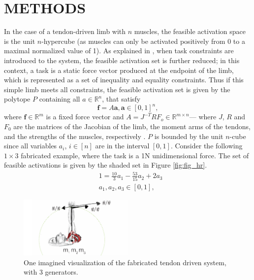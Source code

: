 \section{METHODS}
\label{s:methods}
In the case of a tendon-driven limb with $n$ muscles, the feasible activation space is the unit $n$-hypercube (as muscles can only be activated positively from 0 to a maximal normalized value of 1). As explained in \cite{Valero-Cuevas2009mathematical}, when task constraints are introduced to the system, the feasible activation set is further reduced; in this context, a task is a static force vector produced at the endpoint of the limb, which is represented as a set of inequality and equality constraints. Thus if this simple limb meets all constraints, the feasible activation set is given by the polytope $P$ containing all $a \in \mathbb{R}^n$, that satisfy
\[\textbf{f} = A\textbf{a}, \textbf{a} \in [0,1]^n,\]
where $\textbf{f} \in \mathbb{R}^m$ is a fixed force vector and $A = J^{-T}RF_o \in \mathbb{R}^{m \times n}$--- where $J$, $R$ and $F_0$ are the matrices of the Jacobian of the limb, the moment arms of the tendons, and the strengths of the muscles, respectively \cite{Valero-Cuevas1998Large,Valero-Cuevas2009mathematical}. 
$P$ is bounded by the unit $n$-cube since all variables $a_i$, $i \in [n]$ are in the interval $[0,1]$.
Consider the following $1 \times 3$ fabricated example, where the task is a 1N unidimensional force. The set of feasible activations is given by the shaded set in Figure \ref{fig:fig_hr}.
\begin{align*}
&1 = \frac{10}{3}a_1 - \frac{53}{15}a_2 + 2a_3 \\
&a_1, a_2, a_3 \in [0,1],
\end{align*}

\begin{figure}[schematic_arm]
  \label{fig:schematic_arm}
  \centering
  \includegraphics[width=0.5\textwidth]{sections/figs/schematic_example_drawing.pdf}
  \caption{One imagined visualization of the fabricated tendon driven system, with 3 generators.}
  \label{fig:finger}
\end{figure}


